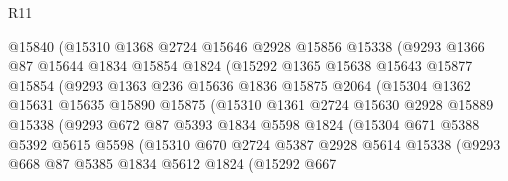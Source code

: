 \begin{lexlean}{R11}
\begin{coremodule}
                    @15840
                    (@15310
                      @1368
                      @2724
                      @15646
                      @2928
                      @15856
                      @15338
                      (@9293
                        @1366
                        @87
                        @15644
                        @1834
                        @15854
                        @1824
                        (@15292
                          @1365
                          @15638
                          @15643
                          @15877
                          @15854
                          (@9293
                            @1363
                            @236
                            @15636
                            @1836
                            @15875
                            @2064
                            (@15304
                              @1362
                              @15631
                              @15635
                              @15890
                              @15875
                              (@15310
                                @1361
                                @2724
                                @15630
                                @2928
                                @15889
                                @15338
                                (@9293
                                  @672
                                  @87
                                  @5393
                                  @1834
                                  @5598
                                  @1824
                                  (@15304
                                    @671
                                    @5388
                                    @5392
                                    @5615
                                    @5598
                                    (@15310
                                      @670
                                      @2724
                                      @5387
                                      @2928
                                      @5614
                                      @15338
                                      (@9293
                                        @668
                                        @87
                                        @5385
                                        @1834
                                        @5612
                                        @1824
                                        (@15292
                                          @667

\end{coremodule}
\end{lexlean}
